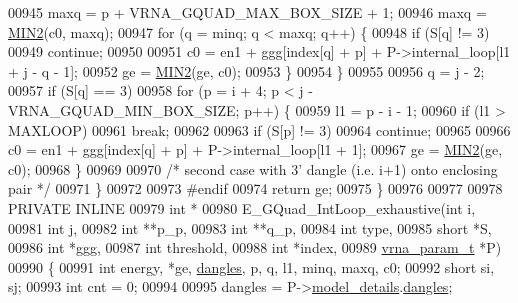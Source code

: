 \begin{DoxyCode}
00945       maxq  = p + VRNA\_GQUAD\_MAX\_BOX\_SIZE + 1;
00946       maxq  = \hyperlink{group__utils_gae0b9cd0ce090bd69b951aa73e8fa4f7d}{MIN2}(c0, maxq);
00947       \textcolor{keywordflow}{for} (q = minq; q < maxq; q++) \{
00948         \textcolor{keywordflow}{if} (S[q] != 3)
00949           \textcolor{keywordflow}{continue};
00950 
00951         c0  = en1 + ggg[index[q] + p] + P->internal\_loop[l1 + j - q - 1];
00952         ge  = \hyperlink{group__utils_gae0b9cd0ce090bd69b951aa73e8fa4f7d}{MIN2}(ge, c0);
00953       \}
00954     \}
00955 
00956     q = j - 2;
00957     \textcolor{keywordflow}{if} (S[q] == 3)
00958       \textcolor{keywordflow}{for} (p = i + 4; p < j - VRNA\_GQUAD\_MIN\_BOX\_SIZE; p++) \{
00959         l1 = p - i - 1;
00960         \textcolor{keywordflow}{if} (l1 > MAXLOOP)
00961           \textcolor{keywordflow}{break};
00962 
00963         \textcolor{keywordflow}{if} (S[p] != 3)
00964           \textcolor{keywordflow}{continue};
00965 
00966         c0  = en1 + ggg[index[q] + p] + P->internal\_loop[l1 + 1];
00967         ge  = \hyperlink{group__utils_gae0b9cd0ce090bd69b951aa73e8fa4f7d}{MIN2}(ge, c0);
00968       \}
00969 
00970     \textcolor{comment}{/* second case with 3' dangle (i.e. i+1) onto enclosing pair */}
00971   \}
00972 
00973 \textcolor{preprocessor}{#endif}
00974   \textcolor{keywordflow}{return} ge;
00975 \}
00976 
00977 
00978 PRIVATE INLINE
00979 \textcolor{keywordtype}{int} *
00980 E\_GQuad\_IntLoop\_exhaustive(\textcolor{keywordtype}{int}          i,
00981                            \textcolor{keywordtype}{int}          j,
00982                            \textcolor{keywordtype}{int}          **p\_p,
00983                            \textcolor{keywordtype}{int}          **q\_p,
00984                            \textcolor{keywordtype}{int}          type,
00985                            \textcolor{keywordtype}{short}        *S,
00986                            \textcolor{keywordtype}{int}          *ggg,
00987                            \textcolor{keywordtype}{int}          threshold,
00988                            \textcolor{keywordtype}{int}          *index,
00989                            \hyperlink{group__energy__parameters_structvrna__param__s}{vrna\_param\_t} *P)
00990 \{
00991   \textcolor{keywordtype}{int}   energy, *ge, \hyperlink{group__model__details_ga72b511ed1201f7e23ec437e468790d74}{dangles}, p, q, l1, minq, maxq, c0;
00992   \textcolor{keywordtype}{short} si, sj;
00993   \textcolor{keywordtype}{int}   cnt = 0;
00994 
00995   dangles = P->\hyperlink{group__energy__parameters_a7b84353eb9075c595bad4ceb871bcae7}{model\_details}.\hyperlink{group__model__details_adcda4ff2ea77748ae0e8700288282efc}{dangles};

\end{DoxyCode}
